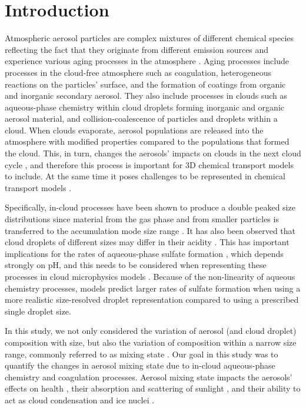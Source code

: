 \documentclass[edeposit,fullpage]{uiucthesis2009}
\begin{document}
\section{Introduction}
Atmospheric aerosol particles are complex mixtures of different
chemical species reflecting the fact that they originate from
different emission sources and experience various aging processes in
the atmosphere \citep{Riemer2009, Li2011a, Bondy2018, Healy2014,
  Rissler2014}.  Aging processes include processes in the cloud-free
atmosphere such as coagulation, heterogeneous reactions on the
particles' surface, and the formation of coatings from organic and
inorganic secondary aerosol. They also include processes in clouds
\citep{Lance2017} such as aqueous-phase chemistry within cloud droplets
forming inorganic and organic aerosol material, and
collision-coalescence of particles and droplets within a cloud. When
clouds evaporate, aerosol populations are released into the atmosphere
with modified properties compared to the populations that formed the
cloud. This, in turn, changes the aerosols' impacts on clouds in the
next cloud cycle \citep{Hoose2008}, and therefore this process is
important for 3D chemical transport models to include. At the same
time it poses challenges to be represented in chemical transport
models \citep{Gao2016}.

Specifically, in-cloud processes have been shown to produce a double
peaked size distributions since material from the gas phase and from
smaller particles is transferred to the accumulation mode size range
\citep{Hoppel1986,Noble2019}. It has also been observed that cloud
droplets of different sizes may differ in their acidity
\citep{Collett1994,Pye2020}. This has important implications for the
rates of aqueous-phase sulfate formation \citep{Hoag1999}, which
depends strongly on pH, and this needs to be considered when
representing these processes in cloud microphysics models
\citep{Hegg1990,Barth2006}. Because of the non-linearity of aqueous
chemistry processes, models predict larger rates of sulfate formation
when using a more realistic size-resolved droplet representation
compared to using a prescribed single droplet size.

In this study, we not only considered the variation of aerosol (and
cloud droplet) composition with size, but also the variation of
composition within a narrow size range, commonly referred to as mixing
state \citep{Winkler1973,Riemer2019}. Our goal in this study was to
quantify the changes in aerosol mixing state due to in-cloud 
aqueous-phase chemistry and coagulation processes. Aerosol mixing state
impacts the aerosols' effects on health \citep{Ching2018}, their
absorption and scattering of sunlight \citep{Lesins2002,Fierce2020},
and their ability to act as cloud condensation and ice nuclei
\citep{Broekhuizen2006,Bhattu2015,Knopf2018}.
\end{document}
